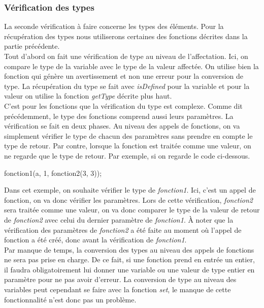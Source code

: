 \documentclass[a4paper]{article}%
\begin{document}
\subsubsection*{Vérification des types} %

La seconde vérification à faire concerne les types des éléments. Pour la
récupération des types nous utiliserons certaines des fonctions décrites dans la
partie précédente.\\

Tout d'abord on fait une vérification de type au niveau de l'affectation.
Ici, on compare le type de la variable avec le type de la valeur affectée. On
utilise bien la fonction qui génère un avertissement et non une erreur pour la
conversion de type. La récupération du type se fait avec \textit{isDefined}
pour la variable et pour la valeur on utilise la fonction \textit{getType}
décrite plus haut.\\

C'est pour les fonctions que la vérification du type est complexe. Comme dit
précédemment, le type des fonctions comprend aussi leurs paramètres. La
vérification se fait en deux phases. Au niveau des appels de fonctions, on va
simplement vérifier le type de chacun des paramètres sans prendre en compte le
type de retour. Par contre, lorsque la fonction est traitée comme une valeur, on
ne regarde que le type de retour. Par exemple, si on regarde le code ci-dessous.

\begin{grammar}[language=C++]
  fonction1(a, 1, fonction2(3, 3));
\end{grammar}\leavevmode\newline

Dans cet exemple, on souhaite vérifier le type de \textit{fonction1}. Ici,
c'est un appel de fonction, on va donc vérifier les paramètres. Lors de cette
vérification, \textit{fonction2} sera traitée comme une valeur, on va donc
comparer le type de la valeur de retour de \textit{fonction2} avec celui du
dernier paramètre de \textit{fonction1}. À noter que la vérification des
paramètres de \textit{fonction2} a été faite au moment où l'appel de fonction a
été créé, donc avant la vérification de \textit{fonction1}.\\

Par manque de temps, la conversion des types au niveau des appels de fonctions
ne sera pas prise en charge. De ce fait, si une fonction prend en entrée un
entier, il faudra obligatoirement lui donner une variable ou une valeur de type
entier en paramètre pour ne pas avoir d'erreur. La conversion de type au niveau
des variables peut cependant se faire avec la fonction \textit{set}, le manque
de cette fonctionnalité n'est donc pas un problème.\\
\end{document}
